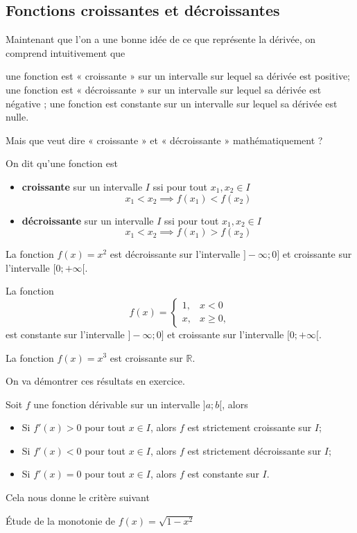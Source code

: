 \documentclass[a4paper,12pt]{article}
\begin{document}
\subsection{Fonctions croissantes et décroissantes}
Maintenant que l'on a une bonne idée de ce que représente la dérivée, on comprend intuitivement que 
\begin{tasks}
\task une fonction est « croissante » sur un intervalle sur lequel sa dérivée est positive;
\task une fonction est « décroissante » sur un intervalle sur lequel sa dérivée est négative ;
\task une fonction est constante sur un intervalle sur lequel sa dérivée est nulle.
\end{tasks}
Mais que veut dire « croissante » et « décroissante » mathématiquement ?
\begin{definition}
	\tcblower
	On dit qu'une fonction est
	\begin{itemize}
		\item {\bfseries croissante} sur un intervalle $I$ ssi pour tout $x_1, x_2\in I$
			\[x_1<x_2\implies f(x_1)<f(x_2)\]

		\item {\bfseries décroissante} sur un intervalle $I$ ssi pour tout $x_1, x_2\in I$
			\[x_1<x_2\implies f(x_1)>f(x_2)\]
	\end{itemize}
\end{definition}
\begin{exemple}
	\tcblower
La fonction $f(x)=x^2$ est décroissante sur l'intervalle $]-\infty;0]$ et croissante sur l'intervalle $[0;+\infty[$. 
\end{exemple}
\begin{exemple}
	\tcblower
	La fonction \[f(x)=\begin{cases}
		1,&x<0\\
		x,&x\geq 0,
	\end{cases}\]
	est constante sur l'intervalle $]-\infty;0]$ et croissante sur l'intervalle $[0;+\infty[$. 
\end{exemple}
\begin{exemple}
	\tcblower
	La fonction $f(x)=x^3$ est croissante sur $\mathbb{R}$.	
\end{exemple}
On va démontrer ces résultats en exercice.
\begin{thm}
	\tcblower
	Soit $f$ une fonction dérivable sur un intervalle $]a;b[$, alors  
	\begin{itemize}
		\item Si $f'(x)>0$ pour tout $x\in I$, alors $f$ est strictement croissante sur $I$;
		\item Si $f'(x)<0$ pour tout $x\in I$, alors $f$ est strictement décroissante sur $I$;
		\item Si $f'(x)=0$ pour tout $x\in I$, alors $f$ est constante sur $I$.
	\end{itemize}
\end{thm}
\begin{formule}
	\tcblower
	Cela nous donne le critère suivant 
\end{formule}
\begin{exemple}
	\tcblower
	Étude de la monotonie de $f(x)=\sqrt{1-x^2}$
	\vspace{6cm}	
\end{exemple}
\end{document}
